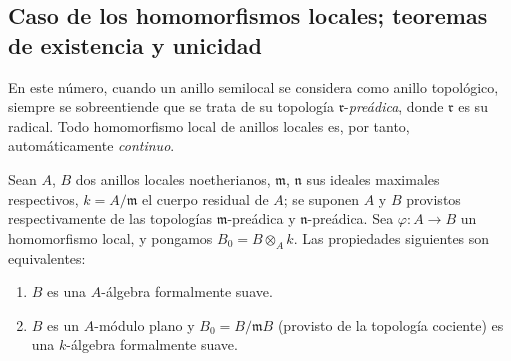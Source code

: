 \subsection{Caso de los homomorfismos locales; teoremas de existencia y
unicidad}
\label{subsection:0.19.7-fr}

En este número, cuando un anillo semilocal se considera como anillo
topológico, siempre se sobreentiende que se trata de su topología
$\mathfrak r$-\emph{preádica}, donde $\mathfrak r$ es su radical. Todo homomorfismo
local de anillos locales es, por tanto, automáticamente \emph{continuo}.

\begin{theorem}[19.7.1]
\label{0.19.7.1-fr}
Sean $A$, $B$ dos anillos locales noetherianos, $\mathfrak m$, $\mathfrak n$
sus ideales maximales respectivos, $k=A/\mathfrak m$ el cuerpo residual de $A$;
se suponen $A$ y $B$ provistos respectivamente de las topologías
$\mathfrak m$-preádica y $\mathfrak n$-preádica. Sea
$\varphi:A\to B$ un homomorfismo local, y pongamos $B_0=B\otimes_A k$.
Las propiedades siguientes son equivalentes:
\begin{enumerate}
  \item[\textup{a)}] $B$ es una $A$-álgebra formalmente suave.


  \item[\textup{b)}] $B$ es un $A$-módulo plano y
  $B_0=B/\mathfrak mB$ (provisto de la topología cociente) es una $k$-álgebra
  formalmente suave.
\end{enumerate}
\end{theorem}

